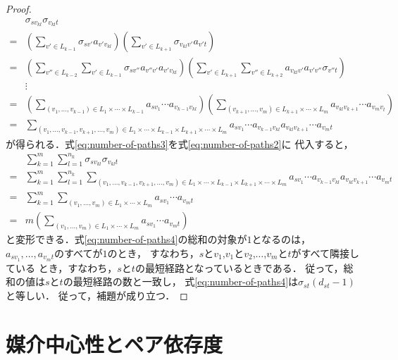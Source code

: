 \begin{proof}
\begin{align}
    &\sigma_{sv_{kl}}\sigma_{v_{kl}t}\nonumber\\
    =&\left(\sum_{v'\in L_{k-1}}\sigma_{sv'}a_{v'v_{kl}}\right)
    \left(\sum_{v'\in L_{k+1}}\sigma_{v_{kl}v'}a_{v't}\right)
    \nonumber\\
    =&\left(\sum_{v''\in L_{k-2}}\sum_{v'\in L_{k-1}}
    \sigma_{sv''}a_{v''v'}a_{v'v_{kl}}\right)
    \left(\sum_{v'\in L_{k+1}}\sum_{v''\in L_{k+2}}
    a_{v_{kl}v'}a_{v'v''}\sigma_{v''t}\right)
    \nonumber\\
    &\vdots\nonumber\\
    =&\left(\sum_{(v_1,\ldots,v_{k-1})\in L_1\times\cdots\times L_{k-1}}
    a_{sv_1}\cdots a_{v_{k-1}v_{kl}}\right)
    \left(\sum_{(v_{k+1},\ldots,v_m)\in L_{k+1}\times\cdots\times L_m}
    a_{v_{kl}v_{k+1}}\cdots a_{v_mv_t}\right)\nonumber\\
    =&\sum_{(v_1,\ldots,v_{k-1},v_{k+1},\ldots,v_m)\in L_1\times\cdots\times L_{k-1}\times L_{k+1}\times\cdots\times L_m}
    a_{sv_1}\cdots a_{v_{k-1}v_{kl}}a_{v_{kl}v_{k+1}}\cdots a_{v_mt}
    \label{eq:number-of-paths3}
  \end{align}
  が得られる．式\eqref{eq:number-of-paths3}を式\eqref{eq:number-of-paths2}に
  代入すると，
  \begin{align}
    &\sum_{k=1}^m\sum_{l=1}^{n_k}\sigma_{sv_{kl}}\sigma_{v_{kl}t}\nonumber\\
    =&\sum_{k=1}^m\sum_{l=1}^{n_k}\sum_{
      (v_1,\ldots,v_{k-1},v_{k+1},\ldots,v_m)\in
      L_1\times\cdots\times L_{k-1}\times L_{k+1}\times\cdots\times L_m
    }a_{sv_1}\cdots a_{v_{k-1}v_{kl}}a_{v_{kl}v_{k+1}}\cdots a_{v_mt}\nonumber\\
    =&\sum_{k=1}^m\sum_{(v_1,\ldots,v_m)\in L_1\times\cdots\times L_m}
    a_{sv_1}\cdots a_{v_mt}\nonumber\\
    =&m\left(\sum_{(v_1,\ldots,v_m)\in L_1\times\cdots\times L_m}
    a_{sv_1}\cdots a_{v_mt}\right)
    \label{eq:number-of-paths4}
  \end{align}
  と変形できる．式\eqref{eq:number-of-paths4}の総和の対象が$1$となるのは，
  $a_{sv_1},\ldots,a_{v_mt}$のすべてが$1$のとき，
  すなわち，$s$と$v_1$,$v_1$と$v_2$,$\ldots$,$v_m$と$t$がすべて隣接している
  とき，すなわち，$s$と$t$の最短経路となっているときである．
  従って，総和の値は$s$と$t$の最短経路の数と一致し，
  式\eqref{eq:number-of-paths4}は$\sigma_{st}(d_{st}-1)$と等しい．
  従って，補題が成り立つ．
\end{proof}

\section{媒介中心性とペア依存度}
\label{sect:pairwise-dependency}

